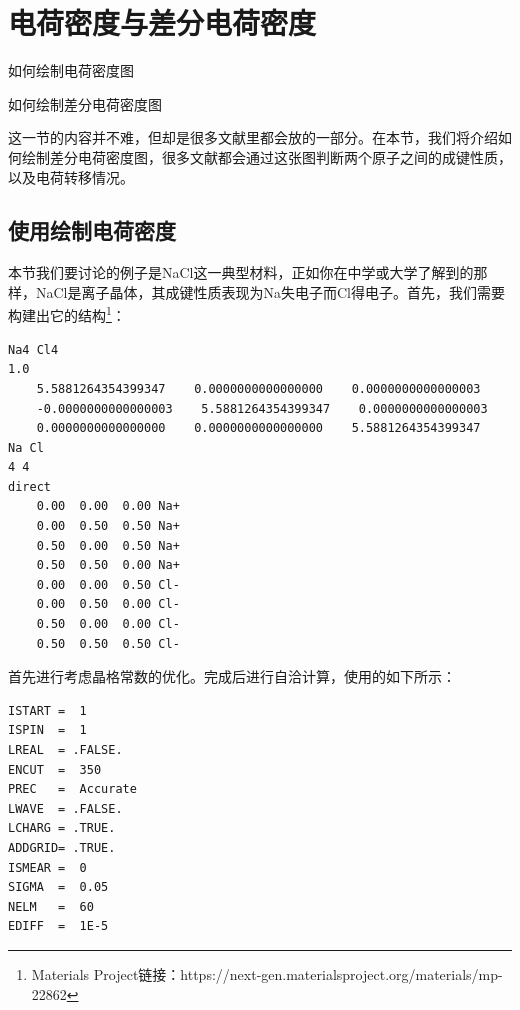 \section{电荷密度与差分电荷密度}\label{sec:电荷密度与差分电荷密度}

\begin{Abstract}
    \item 如何绘制电荷密度图
    \item 如何绘制差分电荷密度图
\end{Abstract}


这一节的内容并不难，但却是很多文献里都会放的一部分。在本节，我们将介绍如何绘制差分电荷密度图，很多文献都会通过这张图判断两个原子之间的成键性质，以及电荷转移情况。

\subsection{使用绘制电荷密度}\label{subsec:电荷密度与差分电荷密度-使用LCHARG绘制电荷密度}

本节我们要讨论的例子是NaCl这一典型材料，正如你在中学或大学了解到的那样，NaCl是离子晶体，其成键性质表现为Na失电子而Cl得电子。首先，我们需要构建出它的结构\footnote{Materials Project链接：https://next-gen.materialsproject.org/materials/mp-22862}：

\begin{lstlisting}[caption=POSCAR]
Na4 Cl4
1.0
    5.5881264354399347    0.0000000000000000    0.0000000000000003
    -0.0000000000000003    5.5881264354399347    0.0000000000000003
    0.0000000000000000    0.0000000000000000    5.5881264354399347
Na Cl
4 4
direct
    0.00  0.00  0.00 Na+
    0.00  0.50  0.50 Na+
    0.50  0.00  0.50 Na+
    0.50  0.50  0.00 Na+
    0.00  0.00  0.50 Cl-
    0.00  0.50  0.00 Cl-
    0.50  0.00  0.00 Cl-
    0.50  0.50  0.50 Cl-
\end{lstlisting}

首先进行考虑晶格常数的优化。完成后进行自洽计算，使用的如下所示：

\begin{lstlisting}[caption=INCAR]
ISTART =  1
ISPIN  =  1
LREAL  = .FALSE.
ENCUT  =  350
PREC   =  Accurate
LWAVE  = .FALSE.
LCHARG = .TRUE.
ADDGRID= .TRUE.
ISMEAR =  0
SIGMA  =  0.05
NELM   =  60
EDIFF  =  1E-5
\end{lstlisting}

